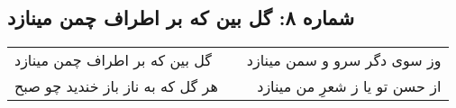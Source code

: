 \begin{center}
\section*{شماره ۸: گل بین که بر اطراف چمن مینازد}
\label{sec:008}
\begin{longtable}{l p{0.5cm} r}
گل بین که بر اطراف چمن مینازد
&&
وز سوی دگر سرو و سمن مینازد
\\
هر گل که به ناز باز خندید چو صبح
&&
از حسن تو یا ز شعرِ من مینازد
\\
\end{longtable}
\end{center}
